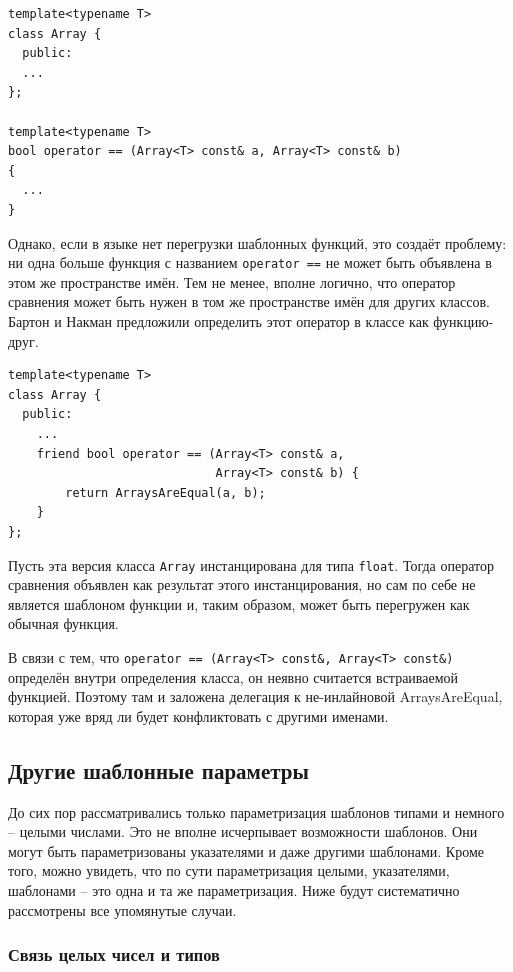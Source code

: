 \documentclass[a4paper,12pt,oneside]{article}
\begin{document}
\begin{lstlisting}
template<typename T> 
class Array { 
  public: 
  ...
}; 

template<typename T> 
bool operator == (Array<T> const& a, Array<T> const& b) 
{ 
  ... 
} 
\end{lstlisting}

Однако, если в языке нет перегрузки шаблонных функций, это создаёт проблему: ни одна больше функция с названием \lstinline!operator ==! не может быть объявлена в этом же пространстве имён. Тем не менее, вполне логично, что оператор сравнения может быть нужен в том же пространстве имён для других классов. Бартон и Накман предложили определить этот оператор в классе как функцию-друг.

\begin{lstlisting}
template<typename T> 
class Array { 
  public: 
    ... 
    friend bool operator == (Array<T> const& a, 
                             Array<T> const& b) { 
        return ArraysAreEqual(a, b); 
    } 
}; 
\end{lstlisting}

Пусть эта версия класса \lstinline!Array! инстанцирована для типа \lstinline!float!. Тогда оператор сравнения объявлен как результат этого инстанцирования, но сам по себе не является шаблоном функции и, таким образом, может быть перегружен как обычная функция.

В связи с тем, что \lstinline!operator == (Array<T> const&, Array<T> const&)! определён внутри определения класса, он неявно считается встраиваемой функцией. Поэтому там и заложена делегация к не-инлайновой ArraysAreEqual, которая уже вряд ли будет конфликтовать с другими именами.

\pagebreak
\subsection{Другие шаблонные параметры}

До сих пор рассматривались только параметризация шаблонов типами и немного -- целыми числами. Это не вполне исчерпывает возможности шаблонов. Они могут быть параметризованы указателями и даже другими шаблонами. Кроме того, можно увидеть, что по сути параметризация целыми, указателями, шаблонами -- это одна и та же параметризация. Ниже будут систематично рассмотрены все упомянутые случаи.

\subsubsection{Связь целых чисел и типов}\label{IntToype}
\end{document}
